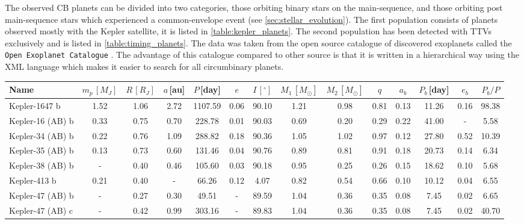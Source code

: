 \documentclass[twoside,openright,titlepage,numbers=noenddot,headinclude,%
                footinclude=true,cleardoublepage=empty,abstractoff, 
                BCOR=5mm,paper=a4,fontsize=11pt,%
                american,%
                ]{scrreprt}%
\begin{document}
The observed CB planets can be divided into two categories, those
orbiting binary stars on the main-sequence, and those orbiting post
main-sequence stars which experienced a common-envelope event (see 
\cref{sec:stellar_evolution}). The first population consists of planets 
observed mostly with the Kepler satellite, it is listed in 
\cref{table:kepler_planets}. The second population has been detected with 
TTVs exclusively and is listed in \cref{table:timing_planets}. The data was 
taken from the open source catalogue of discovered exoplanets called 
the \texttt{Open Exoplanet Catalogue} \citep{catalogue}. The advantage of this
catalogue compared to other source is that it is written in a hierarchical way
using the XML language which makes it easier to search for all circumbinary
planets.
\begin{table}
\centering
\begin{tabular}{lccccccccccccc}
\toprule
    Name & $m_p\,[M_J]$ & $R\,[R_J]$ & $a\,$[au] &$P\,$[day] & $e$ & $I\,[^{\circ}]$ &  $M_1\,[M_\odot]$ &$M_2\,[M_\odot]$ &$q$ &  $a_b$ &   $P_b\,$[day] &  $e_b$ &  $P_b/P$\\
\midrule
Kepler-1647 b    &  1.52 &  1.06 &  2.72 &  1107.59 &  0.06 &  90.10 &    1.21 &    0.98 &  0.81 &      0.13 &     11.26 &      0.16 &      98.38 \\
    Kepler-16 (AB) b &  0.33 &  0.75 &  0.70 &   228.78 &  0.01 &  90.03 &    0.69 &    0.20 &  0.29 &      0.22 &     41.00 &       - &       5.58 \\
    Kepler-34 (AB) b &  0.22 &  0.76 &  1.09 &   288.82 &  0.18 &  90.36 &    1.05 &    1.02 &  0.97 &      0.12 &     27.80 &      0.52 &      10.39 \\
    Kepler-35 (AB) b &  0.13 &  0.73 &  0.60 &   131.46 &  0.04 &  90.76 &    0.89 &    0.81 &  0.91 &      0.18 &     20.73 &      0.14 &       6.34 \\
    Kepler-38 (AB) b &   - &  0.40 &  0.46 &   105.60 &  0.03 &  90.18 &    0.95 &    0.25 &  0.26 &      0.15 &       18.62&      0.10 &        5.68 \\
    Kepler-413 b     &  0.21 &  0.40 &   - &    66.26 &  0.12 &   4.07 &    0.82 &    0.54 &  0.66 &      0.10 &     10.12 &      0.04 &       6.55 \\
    Kepler-47 (AB) b &   - &  0.27 &  0.30 &    49.51 &   - &  89.59 &    1.04 &    0.36 &  0.35 &      0.08 &      7.45 &      0.02 &       6.65 \\
    Kepler-47 (AB) c &   - &  0.42 &  0.99 &   303.16 &   - &  89.83 &    1.04 &    0.36 &  0.35 &      0.08 &      7.45 &      0.02 &      40.70 \\

\end{tabular}
\end{table}
\end{document}
